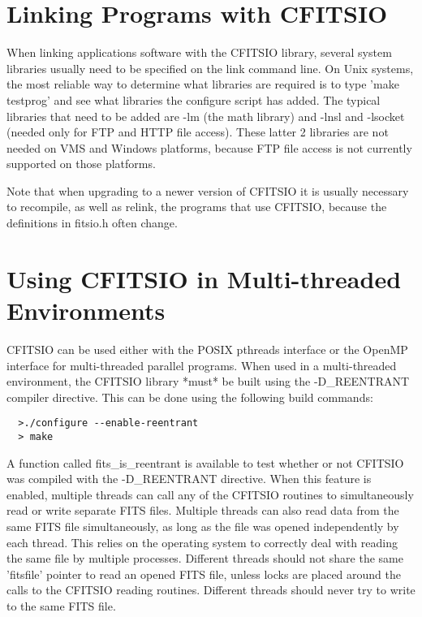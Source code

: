 \documentclass[11pt]{book}
\begin{document}
\section{Linking Programs with CFITSIO}

When linking applications software with the CFITSIO library, several
system libraries usually need to be specified on the link command
line.  On Unix systems, the most reliable way to determine what
libraries are required is to type 'make testprog' and see what
libraries the configure script has added.  The typical libraries that
need to be added are -lm (the math library) and -lnsl and -lsocket
(needed only for FTP and HTTP file access).  These latter 2 libraries
are not needed on VMS and Windows platforms, because FTP file access is
not currently supported on those platforms.

Note that when upgrading to a newer version of CFITSIO it is usually
necessary to recompile, as well as relink, the programs that use CFITSIO,
because the definitions in fitsio.h often change.


\section{Using CFITSIO in Multi-threaded Environments}

CFITSIO can be used either with the
POSIX pthreads interface or the OpenMP interface for multi-threaded
parallel programs.  When used in a multi-threaded environment,
the CFITSIO library *must* be built using
the -D\_REENTRANT compiler directive.  This can be done using the following
build commands:

\begin{verbatim}
  >./configure --enable-reentrant
  > make
\end{verbatim}
A function called fits\_is\_reentrant is available to test
whether or not CFITSIO was compiled with the -D\_REENTRANT
directive.  When this feature is enabled, multiple threads can
call any of the CFITSIO routines
to simultaneously read or write separate
FITS files.  Multiple threads can also read data from
the same FITS file simultaneously, as long as the file
was opened independently by each thread.  This relies on
the operating system to correctly deal with reading the
same file by multiple processes.  Different threads should
not share the same 'fitsfile' pointer to read an opened
FITS file, unless locks are placed around the calls to
the CFITSIO reading routines.
Different threads should never try to write to the same
FITS file.
\end{document}
